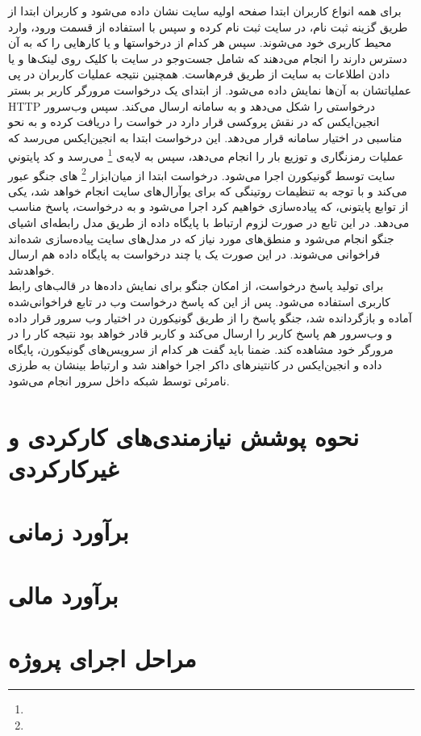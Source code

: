 \documentclass{article}
\begin{document}
برای همه انواع کاربران ابتدا صفحه اولیه سایت نشان داده‌ می‌شود و کاربران ابتدا از طریق گزینه ثبت نام، در سایت ثبت نام کرده و سپس با استفاده از قسمت ورود، وارد محیط کاربری خود می‌شوند. سپس  هر کدام از درخواستها و یا کارهایی را که به آن دسترس دارند را انجام می‌دهند که شامل جست‌و‌جو در سایت با کلیک روی لینک‌ها و یا دادن اطلاعات به سایت از طریق فرم‌هاست. همچنین نتیجه عملیات کاربران در پی عملیاتشان به آن‌ها نمایش داده‌ می‌شود. از ابتدای یک درخواست مرورگر کاربر بر بستر HTTP درخواستی را شکل می‌دهد و به سامانه ارسال می‌کند. سپس وب‌سرور انجین‌ایکس که در نقش پروکسی قرار دارد در خواست را دریافت کرده و به نحو مناسبی در اختیار سامانه  قرار می‌دهد. این درخواست ابتدا به انجین‌ایکس می‌رسد که عملیات رمزنگاری و توزیع بار را انجام می‌دهد، سپس به لایه‌ی \footnote{} می‌رسد و کد پایتونیِ سایت توسط گونیکورن اجرا می‌شود. درخواست ابتدا از میان‌ابزار \footnote{} های جنگو عبور می‌کند و با توجه به تنظیمات روتینگی که برای یو‌آرال‌های سایت انجام خواهد شد، یکی از توابع پایتونی‌، که پیاده‌سازی خواهیم کرد اجرا می‌شود و به درخواست، پاسخ مناسب می‌دهد. در این تابع در صورت لزوم ارتباط با پایگاه داده از طریق مدل‌ رابطه‌ای اشیای جنگو انجام می‌شود و منطق‌های مورد نیاز که در مدل‌های سایت پیاده‌سازی شده‌اند فراخوانی می‌شوند. در این صورت یک یا چند درخواست به پایگاه داده ‌هم ارسال خواهدشد. \\
برای تولید پاسخ درخواست، از امکان جنگو برای نمایش داده‌ها در قالب‌های رابط کاربری استفاده می‌شود. پس از این که پاسخ درخواست وب در تابع فراخوانی‌شده آماده و بازگردانده شد، جنگو پاسخ را از طریق گونیکورن در اختیار وب سرور قرار داده و وب‌سرور هم پاسخ کاربر را ارسال می‌کند و کاربر قادر خواهد بود نتیجه کار را در مرورگر خود مشاهده کند. ضمنا باید گفت هر کدام از سرویس‌های گونیکورن، پایگاه داده و انجین‌ایکس در کانتینرهای داکر اجرا‌ خواهند شد و ارتباط بینشان به طرزی نامرئی توسط شبکه داخل سرور انجام می‌شود.

\section{نحوه پوشش نیازمندی‌های کارکردی و غیرکارکردی}

\section{برآورد زمانی}
\section{برآورد مالی}
\section{مراحل اجرای پروژه}
\end{document}

